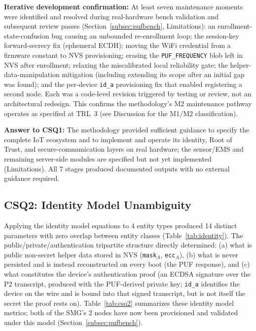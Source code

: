 \documentclass[preprint,12pt,authoryear]{elsarticle}
\begin{document}
\textbf{Iterative development confirmation:} At least seven maintenance moments were identified and resolved during real-hardware bench validation and subsequent review passes (Section~\ref{subsec:pufbench}, Limitations): an enrollment-state-confusion bug causing an unbounded re-enrollment loop; the session-key forward-secrecy fix (ephemeral ECDH); moving the WiFi credential from a firmware constant to NVS provisioning; erasing the \texttt{PUF\_FREQUENCY} blob left in NVS after enrollment; relaxing the miscalibrated local reliability gate; the helper-data-manipulation mitigation (including extending its scope after an initial gap was found); and the per-device \texttt{id\_a} provisioning fix that enabled registering a second node. Each was a code-level revision triggered by testing or review, not an architectural redesign. This confirms the methodology's M2 maintenance pathway operates as specified at TRL~3 (see Discussion for the M1/M2 classification).

\textbf{Answer to CSQ1:} The methodology provided sufficient guidance to specify the complete IoT ecosystem and to implement and operate its identity, Root of Trust, and secure-communication layers on real hardware; the sensor/EMS and remaining server-side modules are specified but not yet implemented (Limitations). All 7 stages produced documented outputs with no external guidance required.

\subsection{CSQ2: Identity Model Unambiguity}

Applying the identity model equations to 4 entity types produced 14 distinct parameters with zero overlap between entity classes (Table~\ref{tab:identity}). The public/private/authentication tripartite structure directly determined: (a) what is public non-secret helper data stored in NVS (\texttt{mask}$_A$, \texttt{ecc}$_A$), (b) what is never persisted and is instead reconstructed on every boot (the PUF response), and (c) what constitutes the device's authentication proof (an ECDSA signature over the P2 transcript, produced with the PUF-derived private key; \texttt{id\_a} identifies the device on the wire and is bound into that signed transcript, but is not itself the secret the proof rests on). Table~\ref{tab:csq2} summarizes these identity model metrics; both of the SMG's 2 nodes have now been provisioned and validated under this model (Section~\ref{subsec:pufbench}).
\end{document}
